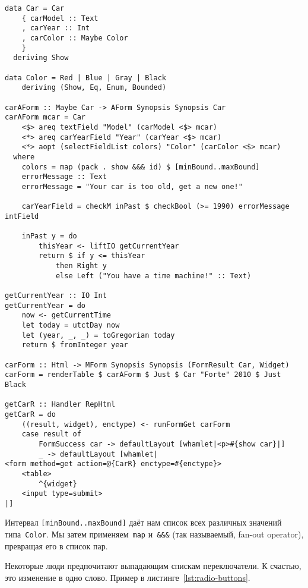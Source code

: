 \begin{lstlisting}[caption={Используя Enum и Bounded}]
data Car = Car
    { carModel :: Text
    , carYear :: Int
    , carColor :: Maybe Color
    }
  deriving Show

data Color = Red | Blue | Gray | Black
    deriving (Show, Eq, Enum, Bounded)

carAForm :: Maybe Car -> AForm Synopsis Synopsis Car
carAForm mcar = Car
    <$> areq textField "Model" (carModel <$> mcar)
    <*> areq carYearField "Year" (carYear <$> mcar)
    <*> aopt (selectFieldList colors) "Color" (carColor <$> mcar)
  where
    colors = map (pack . show &&& id) $ [minBound..maxBound]
    errorMessage :: Text
    errorMessage = "Your car is too old, get a new one!"

    carYearField = checkM inPast $ checkBool (>= 1990) errorMessage intField

    inPast y = do
        thisYear <- liftIO getCurrentYear
        return $ if y <= thisYear
            then Right y
            else Left ("You have a time machine!" :: Text)

getCurrentYear :: IO Int
getCurrentYear = do
    now <- getCurrentTime
    let today = utctDay now
    let (year, _, _) = toGregorian today
    return $ fromInteger year

carForm :: Html -> MForm Synopsis Synopsis (FormResult Car, Widget)
carForm = renderTable $ carAForm $ Just $ Car "Forte" 2010 $ Just Black

getCarR :: Handler RepHtml
getCarR = do
    ((result, widget), enctype) <- runFormGet carForm
    case result of
        FormSuccess car -> defaultLayout [whamlet|<p>#{show car}|]
        _ -> defaultLayout [whamlet|
<form method=get action=@{CarR} enctype=#{enctype}>
    <table>
        ^{widget}
    <input type=submit>
|]
\end{lstlisting}

Интервал \lstinline'[minBound..maxBound]' даёт нам список всех различных
значений типа~\lstinline'Color'. Мы затем применяем~\lstinline'map'
и~\lstinline'&&&' (так называемый, fan-out operator), превращая его в список пар.

Некоторые люди предпочитают выпадающим спискам переключатели.  К счастью, это
изменение в одно слово. Пример в листинге~\ref{lst:radio-buttons}.


